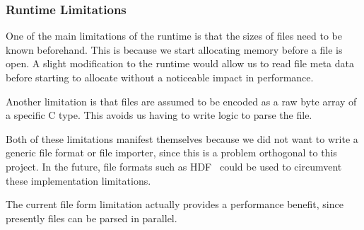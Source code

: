 
\subsubsection{Runtime Limitations}

One of the main limitations of the runtime is that the sizes of files need to
	be known beforehand.
This is because we start allocating memory before a file is open.
A slight modification to the runtime would allow us to read file meta data
	before starting to allocate without a noticeable impact in performance.

Another limitation is that files are assumed to be encoded as a raw byte
	array of a specific C type.
This avoids us having to write logic to parse the file.

Both of these limitations manifest themselves because we did not want to
	write a generic file format or file importer, since this is a problem
	orthogonal to this project.
In the future, file formats such as HDF~\cite{folk2011overview} could be used
to circumvent these implementation limitations.

The current file form limitation actually provides a performance benefit, since
presently files can be parsed in parallel.

